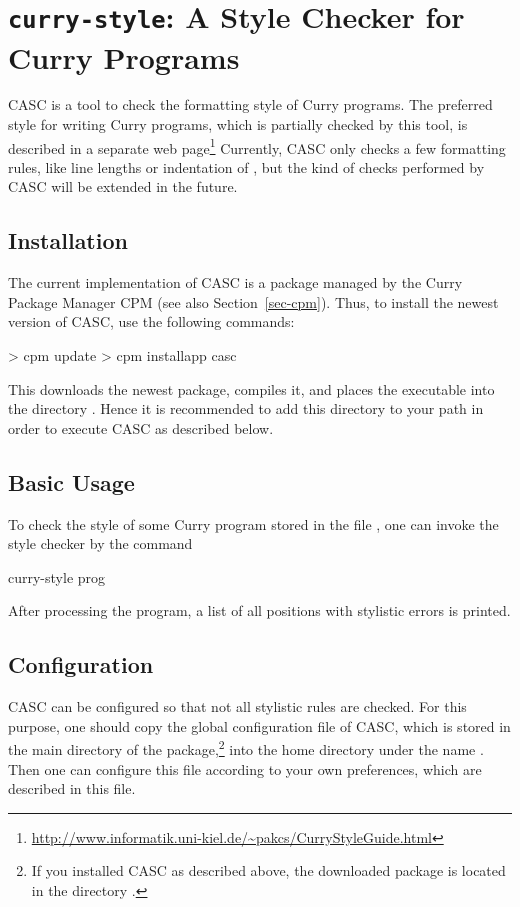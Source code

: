 \section{\texttt{curry-style}: A Style Checker for Curry Programs}
\label{sec-casc}

CASC
is a tool to check the formatting style of Curry programs.
The preferred style for writing Curry programs,
which is partially checked by this tool,
is described in a separate web page\footnote{%
\url{http://www.informatik.uni-kiel.de/~pakcs/CurryStyleGuide.html}}
Currently, CASC only checks a few formatting rules, like
line lengths or
indentation of , but the kind of checks
performed by CASC will be extended in the future.

\subsection{Installation}

The current implementation of CASC is a package
managed by the Curry Package Manager CPM
(see also Section~\ref{sec-cpm}).
Thus, to install the newest version of CASC, use the following commands:
%
\begin{curry}
> cpm update
> cpm installapp casc
\end{curry}
%
This downloads the newest package, compiles it, and places
the executable  into the directory .
Hence it is recommended to add this directory to your path
in order to execute CASC as described below.

\subsection{Basic Usage}

To check the style of some Curry program stored
in the file ,
one can invoke the style checker by
the command
%
\begin{curry}
curry-style prog
\end{curry}
%
After processing the program, a list of all positions
with stylistic errors is printed.


\subsection{Configuration}

CASC can be configured so that not all stylistic rules are checked.
For this purpose, one should copy the global configuration file
 of CASC,
which is stored in the main directory of the package,\footnote{%
If you installed CASC as described above,
the downloaded package is located in the directory
.}
into the home directory under the name .
Then one can configure this file according to your own preferences,
which are described in this file.

